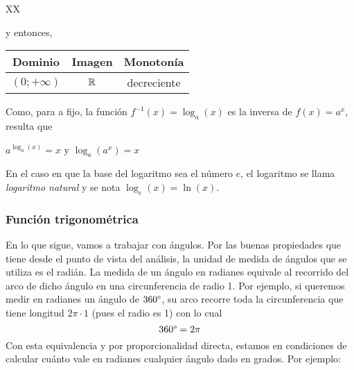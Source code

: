 \documentclass[../Teoría.root.tex]{subfiles}
\begin{document}
\begin{tabularx}{\textwidth}{XX}
\begin{center}
\begin{tikzpicture}
\begin{axis}
                    domain=-5:5,
                    samples= 100,
                    ymin=-2,
                    ymax=4
                ]
                \addplot[color=blue] {Log(0.5,\x)};
                \addlegendentry{\(\textstyle\log_\frac{1}{2}(x)\)}
            \end{axis}
        \end{tikzpicture}
    \end{center} y entonces,
    \begin{center}
        \begin{tabular}{|c|c|c|}
            \hline
            Dominio         & Imagen & Monotonía   \\\hline
            \((0;+\infty)\) & \(\mathbb{R}\) & decreciente \\
            \hline
        \end{tabular}
    \end{center}
\end{tabularx}
Como, para a fijo, la función \(f^{−1}(x) = \log_a(x)\) es la inversa de \(f(x) = a^x\), resulta que
\begin{center}
    \(a^{\log_a(x)}=x\) y \(\log_a(a^x)=x\)
\end{center}
En el caso en que la base del logaritmo sea el número \(e\), el logaritmo se llama \textit{logaritmo natural} y se nota \(\log_e(x) = \ln(x)\).
\subsubsection{Función trigonométrica}
En lo que sigue, vamos a trabajar con ángulos.
Por las buenas propiedades que tiene desde el punto de vista del análisis, la unidad de medida de ángulos que se utiliza es el radián.
La medida de un ángulo en radianes equivale al recorrido del arco de dicho ángulo en una circunferencia de radio 1.
Por ejemplo, si queremos medir en radianes un ángulo de \(360\degree\), su arco recorre toda la circunferencia que tiene longitud \(2\pi \cdot 1\) (pues el radio es 1) con lo cual \[360\degree=2\pi\]
Con esta equivalencia y por proporcionalidad directa, estamos en condiciones de calcular cuánto vale en radianes cualquier ángulo dado en grados.
Por ejemplo:
\end{document}
